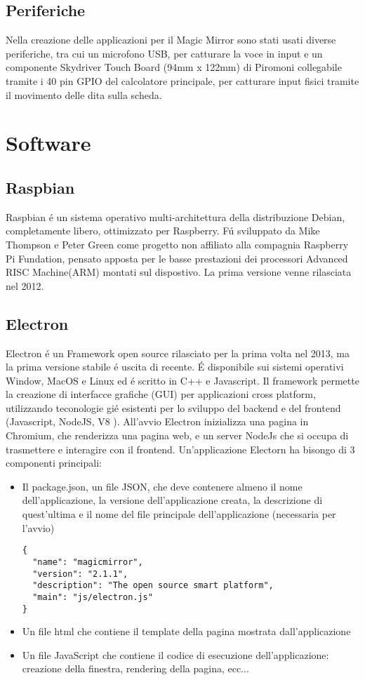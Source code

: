 \subsection{Periferiche}
Nella creazione delle applicazioni per il Magic Mirror sono stati usati diverse periferiche, tra cui un microfono
USB, per catturare la voce in input e un componente Skydriver Touch Board (94mm x 122mm) di Piromoni collegabile tramite
i 40 pin GPIO del calcolatore principale, per catturare input fisici tramite il movimento delle dita sulla scheda.

\section{Software}
\subsection{Raspbian}
Raspbian \'e un sistema operativo multi-architettura della distribuzione Debian, completamente libero,
ottimizzato per Raspberry.
F\'u sviluppato da Mike Thompson e Peter Green come progetto non affiliato alla compagnia Raspberry Pi
Fundation, pensato apposta per le basse prestazioni dei processori Advanced RISC Machine(ARM) montati sul
dispostivo.
La prima versione venne rilasciata nel 2012.

\subsection{Electron}
Electron \'e un Framework open source rilasciato per la prima volta nel 2013, ma la prima versione
stabile \'e uscita di recente. \'E disponibile sui sistemi operativi Window, MacOS e Linux ed \'e scritto
in C++ e Javascript. Il framework permette la creazione di interfacce grafiche (GUI) per
applicazioni cross platform, utilizzando teconologie gi\'e esistenti per lo sviluppo del backend e del frontend
(Javascript, NodeJS, V8 \cite{V8}).
All'avvio Electron inizializza una pagina in Chromium, che renderizza una pagina web, e un server
NodeJs che si occupa di trasmettere e interagire con il frontend.
Un'applicazione Electorn ha bisongo di 3 componenti principali:
\begin{itemize}
\item Il package.json, un file JSON, che deve contenere almeno il nome dell'applicazione,
la versione dell'applicazione creata, la descrizione di quest'ultima e il
 nome del file principale dell'applicazione (necessaria per l'avvio)
\begin{lstlisting}
{
  "name": "magicmirror",
  "version": "2.1.1",
  "description": "The open source smart platform",
  "main": "js/electron.js"
}
\end{lstlisting}
\item Un file html che contiene il template della pagina mostrata dall'applicazione
\item Un file JavaScript che contiene il codice di esecuzione dell'applicazione: creazione della finestra,
rendering della pagina, ecc...
\end{itemize}

